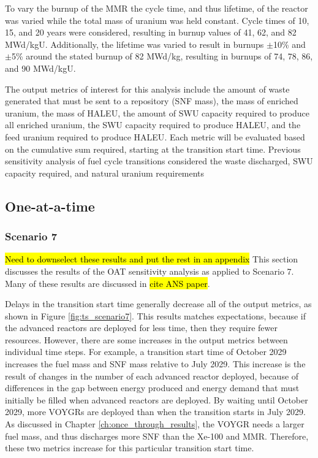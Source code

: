 To vary the burnup of the \gls{MMR} the cycle time, and thus lifetime, of 
the reactor was varied while the total mass of uranium was held constant. 
Cycle times of 10, 15, and 20 years were considered, resulting in burnup 
values of 41, 62, and 82 MWd/kgU. Additionally, the lifetime was varied to 
result in burnups $\pm$10\% and $\pm$5\% around the stated burnup of 
82 MWd/kg, resulting in burnups of 74, 78, 86, and 90 MWd/kgU. 

The output metrics of 
interest for this analysis include the amount of waste generated that 
must be sent to a repository (\gls{SNF} mass), the mass of enriched uranium, 
the mass of \gls{HALEU},
the amount of \gls{SWU} capacity required to produce all enriched uranium, the 
\gls{SWU} capacity required to produce \gls{HALEU}, and the feed uranium 
required to produce \gls{HALEU}. Each metric will be evaluated based on the 
cumulative sum required, starting at the transition start time. Previous 
sensitivity analysis of fuel cycle transitions considered the waste 
discharged, \gls{SWU} 
capacity required, and natural uranium requirements
\cite{richards_application_2021,feng_sensitivity_2020} 


\subsection{One-at-a-time}
\subsubsection{Scenario 7}
\hl{Need to downselect these results and put the rest in an appendix}
This section discusses the results of the \gls{OAT} sensitivity analysis 
as applied to Scenario 7. Many of these results are discussed in 
\hl{cite ANS paper}. 

Delays in the transition start time generally decrease all of the output 
metrics, as shown in Figure \ref{fig:ts_scenario7}. This results matches 
expectations, because if the advanced reactors are deployed for less time, 
then they require fewer resources. However, there are some increases in 
the output metrics between individual time steps. For example, a transition 
start time of October 2029 increases the fuel mass and \gls{SNF} mass 
relative to July 2029. This increase is the result of changes in the number 
of each advanced reactor deployed, because of differences in the gap 
between energy produced and energy demand that must initially be filled when 
advanced reactors are deployed. By waiting until October 2029, more VOYGRs 
are deployed than when the transition starts in July 2029. As discussed in 
Chapter \ref{ch:once_through_results}, the VOYGR needs a larger fuel mass, 
and thus discharges more \gls{SNF} than the Xe-100 and \gls{MMR}. Therefore, 
these two metrics increase for this particular transition start time. 

